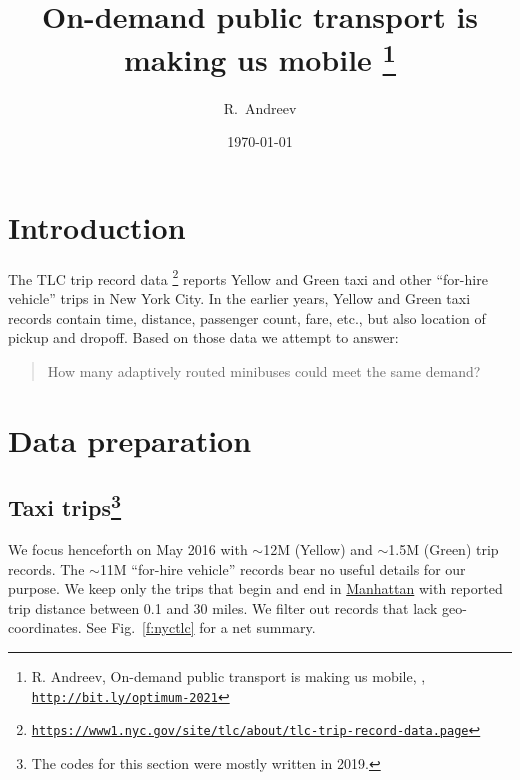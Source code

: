 \documentclass[12pt,notitlepage]{article}
\title{%
	On-demand public transport is making us mobile%
	\footnote{%
		R. Andreev, 
		On-demand public transport is making us mobile,
		\the\year,
		\href{https://bit.ly/optimum-2021}{\texttt{http://bit.ly/optimum-2021}}
	}
}
\date{\today}\author{R.~Andreev}
\begin{document}
\maketitle

\section{Introduction}

The TLC trip record data%
\footnote{\href{https://www1.nyc.gov/site/tlc/about/tlc-trip-record-data.page}{\color{gray}\texttt{https://www1.nyc.gov/site/tlc/about/tlc-trip-record-data.page}}}
reports
Yellow and Green taxi
and other ``for-hire vehicle''
trips 
in New York City.
%
In the earlier years,
Yellow and Green taxi records
contain time,
distance, 
passenger count,
fare, etc.,
but also location of pickup and dropoff.
%
%
Based on those data we attempt to answer:
\begin{quote}
How many adaptively routed minibuses could meet the same demand?
\end{quote}

%


%



%

\section{Data preparation}

\subsection{Taxi trips\footnote{\label{f:oldcode}\color{gray}The codes for this section were mostly written in 2019. }}

\label{s:trips}

We focus henceforth on May 2016
with
$\sim$12M (Yellow) and $\sim$1.5M (Green)
trip records.
%
The $\sim$11M ``for-hire vehicle'' records
bear no useful details for our purpose.
%
%
%
We keep only 
the trips that begin and end in \href{https://www.openstreetmap.org/search?query=manhattan}{\color{black}Manhattan}
with
reported trip distance between 0.1 and 30 miles.
%
We filter out records that
lack geo-coordinates.
%
%
See Fig.~\ref{f:nyctlc} for a net summary.
%
%
\end{document}
